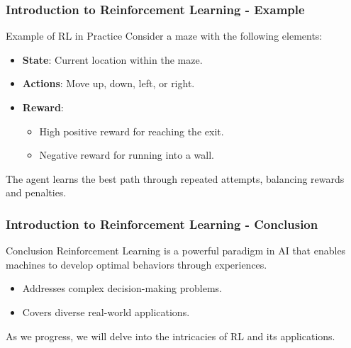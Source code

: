 \documentclass{beamer}
\begin{document}
\begin{frame}[fragile]
    \frametitle{Introduction to Reinforcement Learning - Example}
    
    \begin{block}{Example of RL in Practice}
        Consider a maze with the following elements:
    \end{block}

    \begin{itemize}
        \item \textbf{State}: Current location within the maze.
        \item \textbf{Actions}: Move up, down, left, or right.
        \item \textbf{Reward}: 
            \begin{itemize}
                \item High positive reward for reaching the exit.
                \item Negative reward for running into a wall.
            \end{itemize}
    \end{itemize}

    The agent learns the best path through repeated attempts, balancing rewards and penalties.

\end{frame}

\begin{frame}[fragile]
    \frametitle{Introduction to Reinforcement Learning - Conclusion}

    \begin{block}{Conclusion}
        Reinforcement Learning is a powerful paradigm in AI that enables machines to develop optimal behaviors through experiences. 
    \end{block}
    
    \begin{itemize}
        \item Addresses complex decision-making problems.
        \item Covers diverse real-world applications.
    \end{itemize}

    As we progress, we will delve into the intricacies of RL and its applications.

\end{frame}
\end{document}
